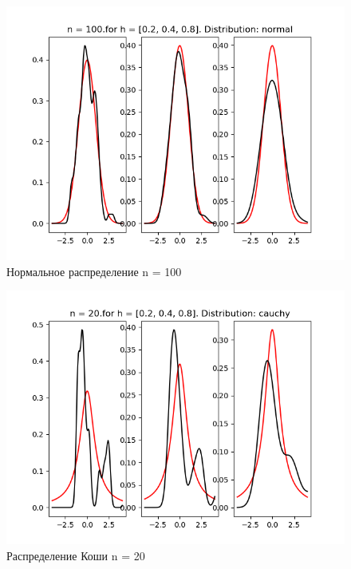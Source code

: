 \documentclass[a4]{article}
\begin{document}
\begin{center}
\begin{figure}[h!]
			\end{figure}
			\newpage
			\begin{figure}[h!]
				\includegraphics[width=\textwidth]{normalker100.png} 
				\caption[Нормальное распределение n = 100]{Нормальное распределение n = 100}
			\end{figure}
			\newpage
			\begin{figure}[h!]
				\includegraphics[width=\textwidth]{cauchyker20.png}
				\caption[Распределение Коши n = 20]{Распределение Коши n = 20}
			\end{figure}
			\newpage
			\begin{figure}[h!]

\end{figure}
\end{center}
\end{document}
